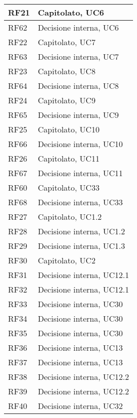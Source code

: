 \begin{center}
\begin{longtable}{|C{5cm}|C{5cm}|}
        \hline
        RF21 & Capitolato, UC6 \\
        \hline
        RF62 &  Decisione interna, UC6 \\
        \hline
        RF22 & Capitolato, UC7 \\
        \hline
        RF63 &  Decisione interna, UC7 \\
        \hline
        RF23 & Capitolato, UC8 \\
        \hline
        RF64 &  Decisione interna, UC8 \\
        \hline
        RF24 & Capitolato, UC9 \\
        \hline
        RF65 &  Decisione interna, UC9 \\
        \hline
        RF25 & Capitolato, UC10 \\
        \hline
        RF66 &  Decisione interna, UC10 \\
        \hline
        RF26 & Capitolato, UC11 \\
        \hline
        RF67 &  Decisione interna, UC11 \\
        \hline
        RF60 & Capitolato, UC33 \\
        \hline
        RF68 &  Decisione interna, UC33 \\
        \hline
        RF27 & Capitolato, UC1.2 \\
        \hline
        RF28 & Decisione interna, UC1.2 \\
        \hline
        RF29 & Decisione interna, UC1.3 \\
        \hline
        RF30 & Capitolato, UC2 \\
        \hline
        RF31 & Decisione interna, UC12.1 \\
        \hline
        RF32 & Decisione interna, UC12.1 \\
        \hline
        RF33 & Decisione interna, UC30 \\
        \hline
        RF34 & Decisione interna, UC30 \\
        \hline
        RF35 & Decisione interna, UC30 \\
        \hline
        RF36 & Decisione interna, UC13 \\
        \hline
        RF37 & Decisione interna, UC13 \\
        \hline
        RF38 & Decisione interna, UC12.2 \\
        \hline
        RF39 & Decisione interna, UC12.2 \\
        \hline
        RF40 & Decisione interna, UC32 \\

\end{longtable}
\end{center}
